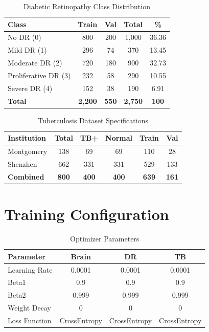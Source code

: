 \documentclass[conference]{IEEEtran}
\begin{document}
\begin{table}[!ht]
\centering
\caption{Diabetic Retinopathy Class Distribution}
\begin{tabular}{|l|c|c|c|c|}
\hline
\textbf{Class} & \textbf{Train} & \textbf{Val} & \textbf{Total} & \textbf{\%} \\
\hline
No DR (0) & 800 & 200 & 1,000 & 36.36 \\
Mild DR (1) & 296 & 74 & 370 & 13.45 \\
Moderate DR (2) & 720 & 180 & 900 & 32.73 \\
Proliferative DR (3) & 232 & 58 & 290 & 10.55 \\
Severe DR (4) & 152 & 38 & 190 & 6.91 \\
\hline
\textbf{Total} & \textbf{2,200} & \textbf{550} & \textbf{2,750} & \textbf{100} \\
\hline
\end{tabular}
\end{table}

\begin{table}[!ht]
\centering
\caption{Tuberculosis Dataset Specifications}
\begin{tabular}{|l|c|c|c|c|c|}
\hline
\textbf{Institution} & \textbf{Total} & \textbf{TB+} & \textbf{Normal} & \textbf{Train} & \textbf{Val} \\
\hline
Montgomery & 138 & 69 & 69 & 110 & 28 \\
Shenzhen & 662 & 331 & 331 & 529 & 133 \\
\hline
\textbf{Combined} & \textbf{800} & \textbf{400} & \textbf{400} & \textbf{639} & \textbf{161} \\
\hline
\end{tabular}
\end{table}

\section{Training Configuration}

\begin{table}[!ht]
\centering
\caption{Optimizer Parameters}
\begin{tabular}{|l|c|c|c|}
\hline
\textbf{Parameter} & \textbf{Brain} & \textbf{DR} & \textbf{TB} \\
\hline
Learning Rate & 0.0001 & 0.0001 & 0.0001 \\
Beta1 & 0.9 & 0.9 & 0.9 \\
Beta2 & 0.999 & 0.999 & 0.999 \\
Weight Decay & 0 & 0 & 0 \\
Loss Function & CrossEntropy & CrossEntropy & CrossEntropy \\
\hline
\end{tabular}
\end{table}
\end{document}
